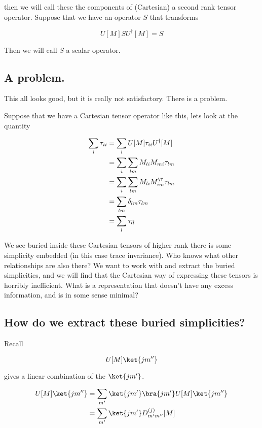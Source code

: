 then we will call these the components of (Cartesian) a second rank tensor operator.  Suppose that we have an operator $S$ that transforms

\begin{equation}\label{eqn:qmTwoL19:210}
U[M] S U^\dagger[M] = S
\end{equation}

Then we will call $S$ a scalar operator.

\subsection{A problem.}

This all looks good, but it is really not satisfactory.  There is a problem.

Suppose that we have a Cartesian tensor operator like this, lets look at the quantity

\begin{align*}
\sum_i \tau_{ii}
&=
\sum_i
U[M] \tau_{ii} U^\dagger[M]  \\
&= 
\sum_i
\sum_{lm} M_{li} M_{mi} \tau_{lm} 
\\
&= 
\sum_i
\sum_{lm} M_{li} M_{im}^\T \tau_{lm} 
\\
&= 
\sum_{lm} \delta_{lm} \tau_{lm} 
\\
&= 
\sum_{l} \tau_{ll} 
\end{align*}

We see buried inside these Cartesian tensors of higher rank there is some simplicity embedded (in this case trace invariance).  Who knows what other relationships are also there?  We want to work with and extract the buried simplicities, and we will find that the Cartesian way of expressing these tensors is horribly inefficient.  What is a representation that doesn't have any excess information, and is in some sense minimal?

\subsection{How do we extract these buried simplicities?}

Recall 

\begin{equation}\label{eqn:qmTwoL19:230}
U[M] \ket{j m''} 
\end{equation}

gives a linear combination of the $\ket{j m'}$.

\begin{align*}
U[M] \ket{j m''} 
&=
\sum_{m'} \ket{j m'} \bra{j m'} U[M] \ket{j m''}  
\\
&=
\sum_{m'} \ket{j m'} 
D^{(j)}_{m' m''}[M] 
\\
\end{align*}

